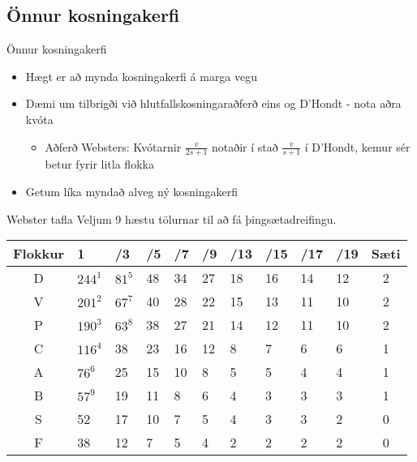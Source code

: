 \documentclass{beamer}
\begin{document}
\subsection{Önnur kosningakerfi}

\begin{frame}{Önnur kosningakerfi}
    \begin{itemize}
        \item Hægt er að mynda kosningakerfi á marga vegu
        \item Dæmi um tilbrigði við hlutfallskosningaraðferð eins og D'Hondt - nota aðra kvóta
        \begin{itemize}
            \item Aðferð Websters: Kvótarnir $\frac{v}{2s+1}$ notaðir í stað $\frac{v}{s+1}$ í D'Hondt, kemur sér betur fyrir litla flokka
        \end{itemize}
        \item Getum líka myndað alveg ný kosningakerfi
    \end{itemize}
\end{frame}

\begin{frame}{Webster tafla}
    Veljum 9 hæstu tölurnar til að fá þingsætadreifingu.
    \begin{center}
        \begin{tabular}{clllllllllc}
            \toprule
            Flokkur&1&/3&/5&/7&/9&/13&/15&/17&/19&Sæti\\
            \midrule
            D&$244^1$&    $81^5$&    48&    34&    27&    18&    16&    14&    12&2\\
            V&$201^2$&    $67^7$&    40&    28&    22&    15&    13&    11&    10&2\\
            P&$190^3$&    $63^8$&    38&    27&    21&    14&    12&    11&    10&2\\
            C&$116^4$&    38&    23&    16&    12&     8&     7&     6&     6&1\\
            A&$76^6$&    25&    15&    10&     8&     5&     5&     4&     4&1\\
            B&$57^9$&    19&    11&     8&     6&     4&     3&     3&     3&1\\
            S& 52&    17&    10&     7&     5&     4&     3&     3&     2&0\\
            F& 38&    12&     7&     5&     4&     2&     2&     2&     2&0\\
            \bottomrule
        \end{tabular}
    \end{center}
\end{frame}
\end{document}
